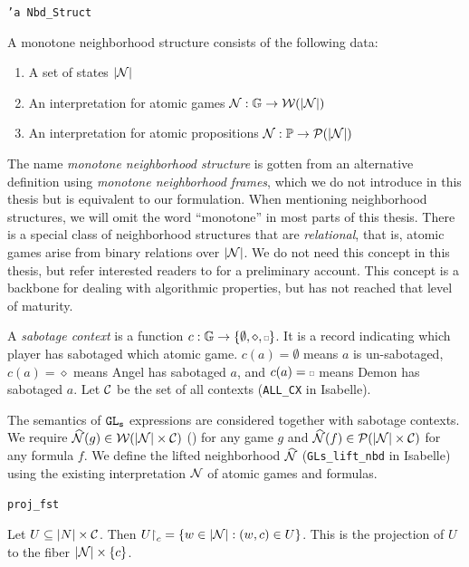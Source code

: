 \begin{bdefinition} \texttt{'a Nbd\_Struct}

A monotone neighborhood structure consists of the following data:

  \begin{enumerate}
    \item A set of states $|\mathcal{N}|$
    \item An interpretation for atomic games $\mathcal{N}: \mathbb{G} \rightarrow \mathcal{W}(|\mathcal{N}|)$
    \item An interpretation for atomic propositions $\mathcal{N}: \mathbb{P} \rightarrow \mathcal{P}(|\mathcal{N}|)$
\end{enumerate}  
\end{bdefinition}


The name \textit{monotone neighborhood structure} is gotten from an alternative definition using \textit{monotone neighborhood frames}, which we do not introduce in this thesis but is equivalent to our formulation. When mentioning neighborhood structures, we will omit the word ``monotone'' in most parts of this thesis. There is a special class of neighborhood structures that are \textit{relational}, that is, atomic games arise from binary relations over $|\mathcal{N}|$. We do not need this concept in this thesis, but refer interested readers to \cite{Wafa_2024} for a preliminary account. This concept is a backbone for dealing with algorithmic properties, but \GLs{} has not reached that level of maturity.

A \textit{sabotage context} is a function $c:\mathbb G\rightarrow \{\emptyset, \diamond, \ssquare\}$. It is a record indicating which player has sabotaged which atomic game. $c(a)=\emptyset$ means $a$ is un-sabotaged, $c(a)=\diamond$ means Angel has sabotaged $a$, and $c(a)=\ssquare$ means Demon has sabotaged $a$. Let $\mathcal C$ be the set of all contexts (\texttt{ALL\_CX} in Isabelle).

The semantics of $\texttt{GL\textsubscript{s}}$ expressions are considered together with sabotage contexts. We require $\widehat{\mathcal N} (g)\in \mathcal W(|\mathcal N|\times \mathcal C)$ () for any \GLs{} game $g$ and $\widehat{\mathcal N}(f)\in \mathcal P (|\mathcal N|\times \mathcal C)$ for any \GLs{} formula $f$. We define the lifted neighborhood $\widehat{\mathcal N}$ (\texttt{GLs\_lift\_nbd} in Isabelle) using the existing interpretation $\mathcal N$ of atomic games and formulas.

\begin{bdefinition}[Projection]
\texttt{proj\_fst}

    Let $U\subseteq |N|\times \mathcal C$. Then $U\mathord{\upharpoonright}_c = \{w\in |\mathcal N|:(w,c)\in U \}$. This is the projection of $U$ to the fiber $|\mathcal N| \times \{c\}$.
\end{bdefinition}

